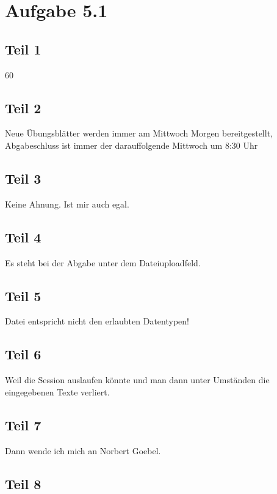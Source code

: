 \documentclass[10pt,a4paper]{article}
\begin{document}
\section*{Aufgabe 5.1}

\subsection*{Teil 1}

60%

\subsection*{Teil 2}

Neue Übungsblätter werden immer am Mittwoch Morgen bereitgestellt, Abgabeschluss ist immer der darauffolgende Mittwoch um 8:30 Uhr

\subsection*{Teil 3}

Keine Ahnung. Ist mir auch egal.

\subsection*{Teil 4}

Es steht bei der Abgabe unter dem Dateiuploadfeld.

\subsection*{Teil 5}

Datei entspricht nicht den erlaubten Datentypen!

\subsection*{Teil 6}

Weil die Session auslaufen könnte und man dann unter Umständen die eingegebenen Texte verliert.

\subsection*{Teil 7}

Dann wende ich mich an Norbert Goebel.

\subsection*{Teil 8}
\end{document}
